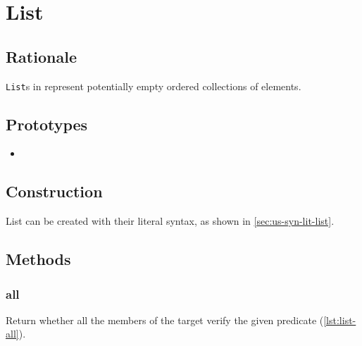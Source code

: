 \section{List}
\subsection{Rationale}

\lstinline|List|s in \us represent potentially empty ordered
collections of elements.

\subsection{Prototypes}

\begin{itemize}
\item {}
\end{itemize}

\subsection{Construction}

List can be created with their literal syntax, as shown in
\autoref{sec:us-syn-lit-list}.


\subsection{Methods}

\subsubsection{all}

Return whether all the members of the target verify the given
predicate (\autoref{lst:list-all}).


